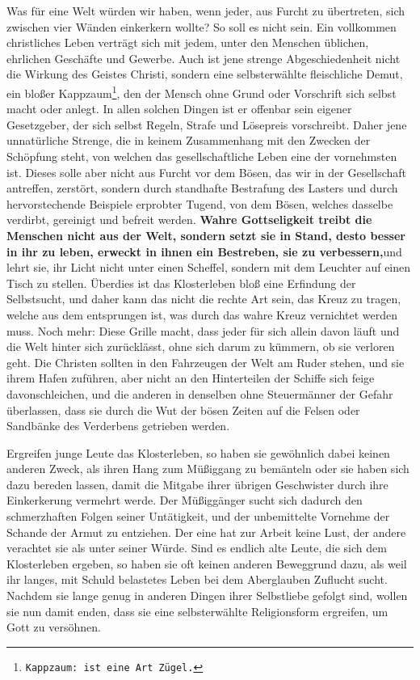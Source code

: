 \medskip

Was für eine Welt würden wir haben, wenn jeder, aus Furcht zu übertreten, sich
zwischen vier Wänden einkerkern wollte? So soll es nicht sein. Ein vollkommen
christliches Leben verträgt sich mit jedem, unter den Menschen üblichen,
ehrlichen Geschäfte und Gewerbe. Auch ist jene strenge Abgeschiedenheit nicht
die Wirkung des Geistes Christi, sondern eine selbsterwählte fleischliche
Demut, ein bloßer Kappzaum\footnote{\texttt{Kappzaum: ist eine Art Zügel.}}, den
der Mensch ohne Grund oder Vorschrift sich
selbst macht oder anlegt. In allen solchen Dingen ist er offenbar sein eigener
Gesetzgeber, der sich selbst Regeln, Strafe und Lösepreis vorschreibt. Daher
jene unnatürliche Strenge, die in keinem
Zusammenhang mit den Zwecken der
Schöpfung steht, von welchen das gesellschaftliche Leben eine der vornehmsten
ist. Dieses solle aber nicht aus Furcht vor dem Bösen, das wir in der
Gesellschaft antreffen, zerstört, sondern durch standhafte Bestrafung des
Lasters und durch hervorstechende Beispiele erprobter Tugend, von dem Bösen,
welches dasselbe verdirbt, gereinigt und befreit werden. \textbf{Wahre
Gottseligkeit
treibt die Menschen nicht aus der Welt, sondern setzt sie in Stand, desto besser
in ihr zu leben, erweckt in ihnen ein Bestreben, sie zu verbessern,}und lehrt
sie, ihr Licht nicht unter einen Scheffel, sondern mit dem Leuchter auf einen
Tisch zu stellen. Überdies ist das Klosterleben bloß eine Erfindung der
Selbstsucht, und daher kann das nicht die rechte Art sein, das Kreuz zu tragen,
welche aus dem entsprungen ist, was durch das wahre Kreuz vernichtet werden
muss.
Noch mehr: Diese Grille macht, dass jeder für sich allein davon läuft
und die
Welt hinter sich zurücklässt, ohne sich darum zu kümmern, ob sie verloren
geht. Die Christen sollten in den Fahrzeugen der
Welt am Ruder stehen, und sie
ihrem Hafen zuführen, aber nicht an den Hinterteilen der Schiffe sich feige
davonschleichen, und die anderen in denselben ohne Steuermänner der Gefahr
überlassen, dass sie durch die Wut der bösen Zeiten auf die Felsen oder
Sandbänke des Verderbens getrieben werden.
\label{ref:05_11_kloster_ende}

\medskip

Ergreifen junge Leute das Klosterleben, so haben
sie gewöhnlich dabei keinen
anderen Zweck, als ihren Hang zum Müßiggang zu bemänteln oder sie haben sich
dazu bereden lassen, damit die Mitgabe ihrer übrigen Geschwister durch ihre
Einkerkerung vermehrt werde. Der Müßiggänger sucht sich dadurch den
schmerzhaften Folgen seiner Untätigkeit, und der unbemittelte Vornehme der
Schande der Armut zu entziehen. Der eine hat zur Arbeit keine Lust, der andere
verachtet sie als unter seiner Würde. Sind es endlich alte Leute, die sich dem
Klosterleben ergeben, so haben sie oft keinen anderen Beweggrund dazu, als weil
ihr langes, mit Schuld belastetes Leben bei dem Aberglauben
Zuflucht sucht.
Nachdem sie lange genug in anderen Dingen ihrer Selbstliebe gefolgt sind, wollen
sie nun damit enden, dass sie eine selbsterwählte Religionsform ergreifen, um
Gott zu versöhnen.

